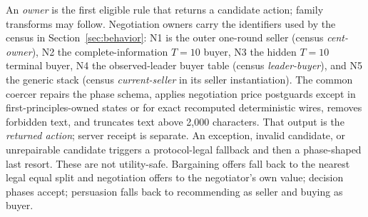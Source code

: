 An \emph{owner} is the first eligible rule that returns a candidate action;
family transforms may follow. Negotiation owners carry the identifiers used by
the census in Section~\ref{sec:behavior}: N1 is the outer one-round seller
(census \emph{cent-owner}), N2 the complete-information $T=10$ buyer, N3 the
hidden $T=10$ terminal buyer, N4 the observed-leader buyer table (census
\emph{leader-buyer}), and N5 the generic stack (census \emph{current-seller}
in its seller instantiation). The common coercer repairs the phase schema,
applies negotiation price postguards except in first-principles-owned states or
for exact recomputed deterministic wires, removes forbidden text, and truncates
text above 2,000 characters. That output is the \emph{returned action}; server
receipt is separate. An exception, invalid candidate, or unrepairable candidate
triggers a protocol-legal fallback and then a phase-shaped last resort. These
are not utility-safe. Bargaining offers fall back to the nearest legal equal
split and negotiation offers to the negotiator's own value; decision phases
accept; persuasion falls back to recommending as seller and buying as buyer.

